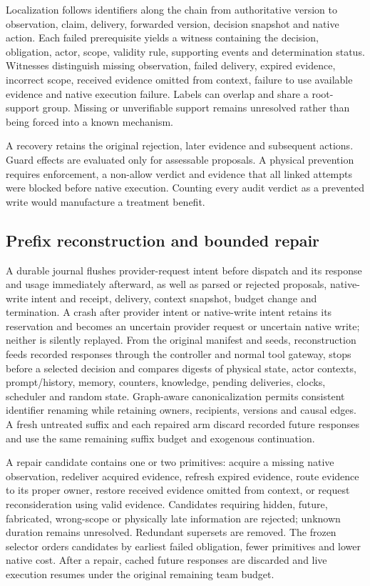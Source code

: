 \documentclass[sigconf,anonymous]{aamas}
\begin{document}
Localization follows identifiers along the chain from authoritative version to observation, claim, delivery, forwarded version, decision snapshot and native action. Each failed prerequisite yields a witness containing the decision, obligation, actor, scope, validity rule, supporting events and determination status. Witnesses distinguish missing observation, failed delivery, expired evidence, incorrect scope, received evidence omitted from context, failure to use available evidence and native execution failure. Labels can overlap and share a root-support group. Missing or unverifiable support remains unresolved rather than being forced into a known mechanism.

A recovery retains the original rejection, later evidence and subsequent actions. Guard effects are evaluated only for assessable proposals. A physical prevention requires enforcement, a non-allow verdict and evidence that all linked attempts were blocked before native execution. Counting every audit verdict as a prevented write would manufacture a treatment benefit.

\subsection{Prefix reconstruction and bounded repair}
A durable journal flushes provider-request intent before dispatch and its response and usage immediately afterward, as well as parsed or rejected proposals, native-write intent and receipt, delivery, context snapshot, budget change and termination. A crash after provider intent or native-write intent retains its reservation and becomes an uncertain provider request or uncertain native write; neither is silently replayed. From the original manifest and seeds, reconstruction feeds recorded responses through the controller and normal tool gateway, stops before a selected decision and compares digests of physical state, actor contexts, prompt/history, memory, counters, knowledge, pending deliveries, clocks, scheduler and random state. Graph-aware canonicalization permits consistent identifier renaming while retaining owners, recipients, versions and causal edges. A fresh untreated suffix and each repaired arm discard recorded future responses and use the same remaining suffix budget and exogenous continuation.

A repair candidate contains one or two primitives: acquire a missing native observation, redeliver acquired evidence, refresh expired evidence, route evidence to its proper owner, restore received evidence omitted from context, or request reconsideration using valid evidence. Candidates requiring hidden, future, fabricated, wrong-scope or physically late information are rejected; unknown duration remains unresolved. Redundant supersets are removed. The frozen selector orders candidates by earliest failed obligation, fewer primitives and lower native cost. After a repair, cached future responses are discarded and live execution resumes under the original remaining team budget.
\end{document}
